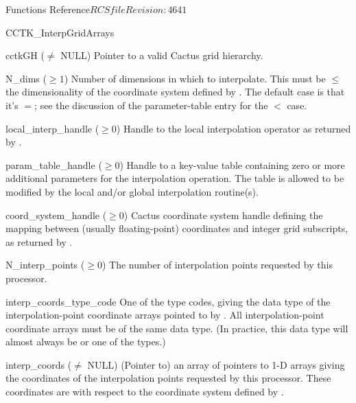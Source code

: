 \begin{cactuspart}{ Functions Reference}{$RCSfile$}{$Revision: 4641 $}
\begin{FunctionDescription}{CCTK\_InterpGridArrays}
\begin{ParameterSection}
\begin{Parameter}{cctkGH ($\ne$ NULL)}
Pointer to a valid Cactus grid hierarchy.
\end{Parameter}
\begin{Parameter}{N\_dims ($\ge 1$)}
Number of dimensions in which to interpolate.
This must be $\leq$ the dimensionality of the coordinate system defined
by .  The default case is that it's $=$; see
the discussion of the  parameter-table
entry for the $<$ case.
\end{Parameter}
\begin{Parameter}{local\_interp\_handle ($\ge 0$)}
Handle to the local interpolation operator as returned by
.
\end{Parameter}
\begin{Parameter}{param\_table\_handle ($\ge 0$)}
Handle to a key-value table containing zero or more additional parameters
for the interpolation operation. The table is allowed to be modified by the
local and/or global interpolation routine(s).
\end{Parameter}
\begin{Parameter}{coord\_system\_handle ($\ge 0$)}
Cactus coordinate system handle defining the mapping between
(usually floating-point) coordinates and integer grid subscripts, as returned by
.
\end{Parameter}
\begin{Parameter}{N\_interp\_points ($\ge 0$)}
The number of interpolation points requested by this processor.
\end{Parameter}
\begin{Parameter}{interp\_coords\_type\_code}
One of the  type codes, giving the data type of the
interpolation-point coordinate arrays pointed to by .
All interpolation-point coordinate arrays must be of the same data type.
(In practice, this data type will almost always be 
or one of the  types.)
\end{Parameter}
\begin{Parameter}{interp\_coords ($\ne$ NULL)}
(Pointer to) an array of  pointers to 1-D arrays giving the
coordinates of the interpolation points requested by this processor.
These coordinates are with respect to the coordinate system defined by
.
\end{Parameter}

\end{ParameterSection}
\end{FunctionDescription}
\end{cactuspart}
